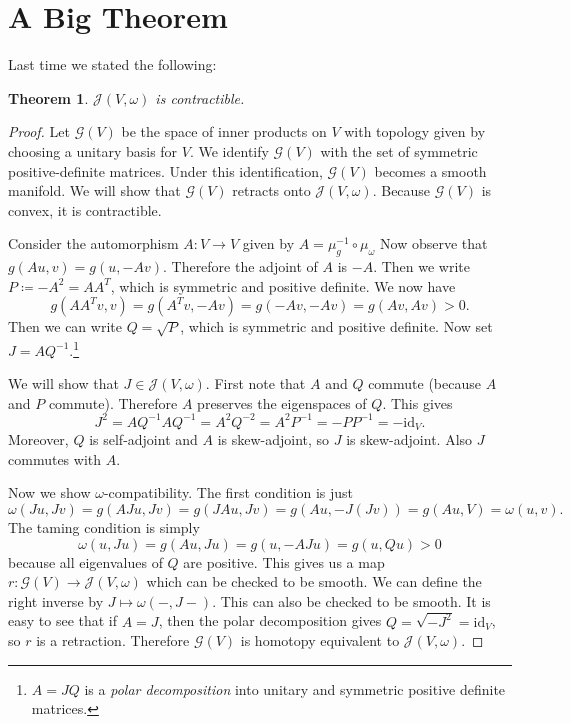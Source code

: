 \documentclass[leqno, openany]{memoir}
\theoremstyle{definition}
\theoremstyle{remark}
\theoremstyle{plain}
\newtheorem*{thm*}{Theorem}
\theoremstyle{definition}
\theoremstyle{remark}
\newcommand{\mc}[1]{\mathcal{#1}}
\newcommand{\mr}[1]{\mathrm{#1}}
\begin{document}
\section{A Big Theorem}%
\label{sec:a_big_theorem}

Last time we stated the following:

\begin{thm*}
    $\mc{J}(V, \omega)$ is contractible.
\end{thm*}

\begin{proof}
    Let $\mc{G}(V)$ be the space of inner products on $V$ with topology given by choosing a unitary basis for $V$. We identify $\mc{G}(V)$ with the set of symmetric positive-definite matrices. Under this identification, $\mc{G}(V)$ becomes a smooth manifold. We will show that $\mc{G}(V)$ retracts onto $\mc{J}(V, \omega)$. Because $\mc{G}(V)$ is convex, it is contractible.

    Consider the automorphism $A:V \to V$ given by $A = \mu_{g}^{-1} \circ \mu_{\omega}$ Now observe that $g(Au, v) = g(u, -Av)$. Therefore the adjoint of $A$ is $-A$. Then we write $P \coloneqq -A^2 = AA^T$, which is symmetric and positive definite. We now have
    \[ g(AA^Tv, v) = g(A^T v, -Av) = g(-Av, -Av) = g(Av, Av) > 0. \]
    Then we can write $Q = \sqrt{P}$, which is symmetric and positive definite. Now set $J = AQ^{-1}$.\footnote{$A = JQ$ is a \textit{polar decomposition} into unitary and symmetric positive definite matrices.}

    We will show that $J \in \mc{J}(V, \omega)$. First note that $A$ and $Q$ commute (because $A$ and $P$ commute). Therefore $A$ preserves the eigenspaces of $Q$. This gives 
    \[ J^2 = AQ^{-1}AQ^{-1} = A^2Q^{-2} = A^2P^{-1} = -P P^{-1} = - \mr{id}_V.\]
    Moreover, $Q$ is self-adjoint and $A$ is skew-adjoint, so $J$ is skew-adjoint. Also $J$ commutes with $A$. 

    Now we show $\omega$-compatibility. The first condition is just
    \[ \omega(Ju, Jv) = g(AJu, Jv) = g(JAu, Jv) = g(Au, -J(Jv)) = g(Au, V) = \omega(u,v).\]
    The taming condition is simply
    \[ \omega(u, Ju) = g(Au, Ju) = g(u, -AJu) = g(u, Qu) > 0 \]
    because all eigenvalues of $Q$ are positive. This gives us a map $r: \mc{G}(V) \to \mc{J}(V, \omega)$ which can be checked to be smooth. We can define the right inverse by $J \mapsto \omega(-, J-)$. This can also be checked to be smooth. It is easy to see that if $A = J$, then the polar decomposition gives $Q = \sqrt{-J^2} = \mr{id}_V$, so $r$ is a retraction. Therefore $\mc{G}(V)$ is homotopy equivalent to $\mc{J}(V, \omega)$.
\end{proof}
\end{document}
